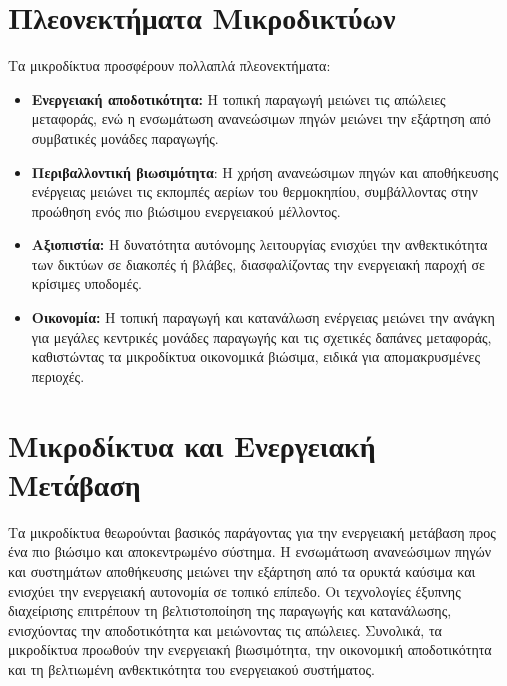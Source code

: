 \section{Πλεονεκτήματα Μικροδικτύων} 
Τα μικροδίκτυα προσφέρουν πολλαπλά πλεονεκτήματα:
\begin{itemize}
    \item \textbf{Ενεργειακή αποδοτικότητα:} Η τοπική παραγωγή μειώνει τις απώλειες μεταφοράς, ενώ η ενσωμάτωση ανανεώσιμων πηγών μειώνει την εξάρτηση από συμβατικές μονάδες παραγωγής. 
    \\
    \item \textbf{Περιβαλλοντική βιωσιμότητα}: Η χρήση ανανεώσιμων πηγών και αποθήκευσης ενέργειας μειώνει τις εκπομπές αερίων του θερμοκηπίου, συμβάλλοντας στην προώθηση ενός πιο βιώσιμου ενεργειακού μέλλοντος.
    \\
    \item \textbf{Αξιοπιστία:} Η δυνατότητα αυτόνομης λειτουργίας ενισχύει την ανθεκτικότητα των δικτύων σε διακοπές ή βλάβες, διασφαλίζοντας την ενεργειακή παροχή σε κρίσιμες υποδομές.
    \\
    \item \textbf{Οικονομία:} Η τοπική παραγωγή και κατανάλωση ενέργειας μειώνει την ανάγκη για μεγάλες κεντρικές μονάδες παραγωγής και τις σχετικές δαπάνες μεταφοράς, καθιστώντας τα μικροδίκτυα οικονομικά βιώσιμα, ειδικά για απομακρυσμένες περιοχές.
\end{itemize}

\section{Μικροδίκτυα και Ενεργειακή Μετάβαση} 
Τα μικροδίκτυα θεωρούνται βασικός παράγοντας για την ενεργειακή μετάβαση προς ένα πιο βιώσιμο και αποκεντρωμένο σύστημα. Η ενσωμάτωση ανανεώσιμων πηγών και συστημάτων αποθήκευσης μειώνει την εξάρτηση από τα ορυκτά καύσιμα και ενισχύει την ενεργειακή αυτονομία σε τοπικό επίπεδο. Οι τεχνολογίες έξυπνης διαχείρισης επιτρέπουν τη βελτιστοποίηση της παραγωγής και κατανάλωσης, ενισχύοντας την αποδοτικότητα και μειώνοντας τις απώλειες. Συνολικά, τα μικροδίκτυα προωθούν την ενεργειακή βιωσιμότητα, την οικονομική αποδοτικότητα και τη βελτιωμένη ανθεκτικότητα του ενεργειακού συστήματος.